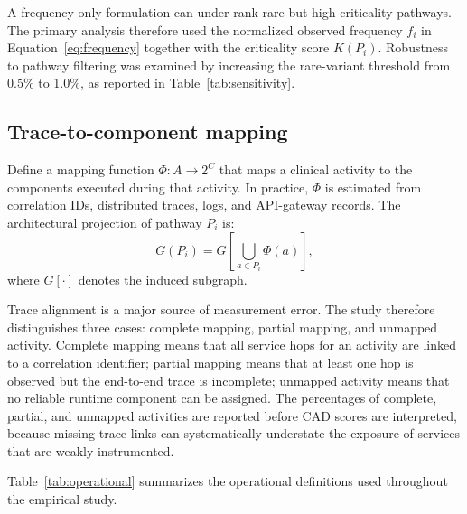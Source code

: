 \documentclass[english,preprint]{elsarticle}
\newcommand{\CAD}{\textsc{CAD}\xspace}
\begin{document}
A frequency-only formulation can under-rank rare but high-criticality pathways. The primary analysis therefore used the normalized observed frequency $f_i$ in Equation~\eqref{eq:frequency} together with the criticality score $K(P_i)$. Robustness to pathway filtering was examined by increasing the rare-variant threshold from 0.5\% to 1.0\%, as reported in Table~\ref{tab:sensitivity}.

\subsection{Trace-to-component mapping}

Define a mapping function $\Phi:A\rightarrow 2^C$ that maps a clinical activity to the components executed during that activity. In practice, $\Phi$ is estimated from correlation IDs, distributed traces, logs, and API-gateway records. The architectural projection of pathway $P_i$ is:
\begin{equation}
G(P_i)=G\!\left[\bigcup_{a\in P_i}\Phi(a)\right],
\label{eq:projection}
\end{equation}
where $G[\cdot]$ denotes the induced subgraph.

Trace alignment is a major source of measurement error. The study therefore distinguishes three cases: complete mapping, partial mapping, and unmapped activity. Complete mapping means that all service hops for an activity are linked to a correlation identifier; partial mapping means that at least one hop is observed but the end-to-end trace is incomplete; unmapped activity means that no reliable runtime component can be assigned. The percentages of complete, partial, and unmapped activities are reported before \CAD scores are interpreted, because missing trace links can systematically understate the exposure of services that are weakly instrumented.

Table~\ref{tab:operational} summarizes the operational definitions used throughout the empirical study.
\end{document}
